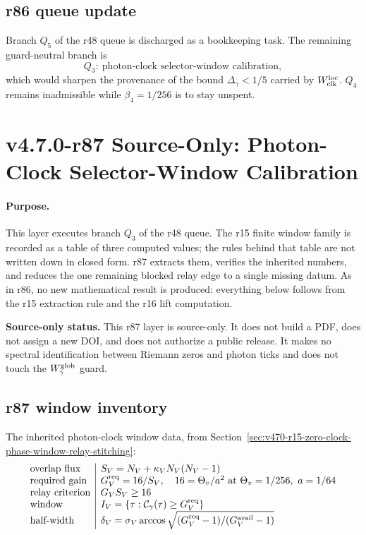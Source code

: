 \subsection*{r86 queue update}
\label{subsec:r86-queue-update}

Branch \(Q_5\) of the r48 queue is discharged as a bookkeeping task.  The remaining
guard-neutral branch is
\[
Q_3:\ \text{photon-clock selector-window calibration},
\]
which would sharpen the provenance of the bound \(\Delta_\gamma<1/5\) carried by
\(W_{\rm clk}^{\rm loc}\).  \(Q_4\) remains inadmissible while \(\beta_4=1/256\) is to stay
unspent.


\clearpage
\section*{v4.7.0-r87 Source-Only: Photon-Clock Selector-Window Calibration}
\label{sec:r87-photon-clock-window-calibration}

\paragraph{Purpose.}
This layer executes branch \(Q_3\) of the r48 queue.  The r15 finite window family is
recorded as a table of three computed values; the rules behind that table are not written
down in closed form.  r87 extracts them, verifies the inherited numbers, and reduces the one
remaining blocked relay edge to a single missing datum.  As in r86, no new mathematical
result is produced: everything below follows from the r15 extraction rule and the r16 lift
computation.

\noindent\textbf{Source-only status.}
This r87 layer is source-only.  It does not build a PDF, does not assign a new DOI, and does
not authorize a public release.  It makes no spectral identification between Riemann zeros
and photon ticks and does not touch the \(W_\gamma^{\rm glob}\) guard.

\subsection*{r87 window inventory}
\label{subsec:r87-window-inventory}

The inherited photon-clock window data, from
Section~\ref{sec:v470-r15-zero-clock-phase-window-relay-stitching}:
\[
\begin{array}{l|l}
\text{overlap flux} & S_V=N_V+\kappa_V N_V(N_V-1)\\
\text{required gain} & G_V^{\rm req}=16/S_V,\quad 16=\Theta_v/a^2
 \text{ at }\Theta_v=1/256,\ a=1/64\\
\text{relay criterion} & G_VS_V\ge16\\
\text{window} & I_V=\{\tau:\mathcal C_\gamma(\tau)\ge G_V^{\rm req}\}\\
\text{half-width} & \delta_V=\sigma_V\arccos\sqrt{(G_V^{\rm req}-1)/(G_V^{\rm avail}-1)}
\end{array}
\]

